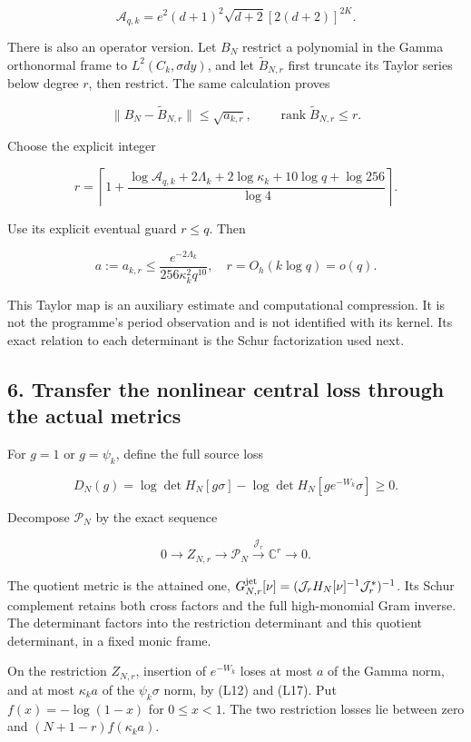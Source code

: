 \[
\mathcal A_{q,k}=e^2(d+1)^2\sqrt{d+2}[2(d+2)]^{2K}.
\]

There is also an operator version. Let \(B_N\) restrict a polynomial in the Gamma orthonormal frame to \(L^2(C_k,\sigma dy)\), and let \(\widetilde B_{N,r}\) first truncate its Taylor series below degree \(r\), then restrict. The same calculation proves

\[
\|B_N-\widetilde B_{N,r}\|\le\sqrt{a_{k,r}},\qquad
\operatorname{rank}\widetilde B_{N,r}\le r.
\tag{L18}
\]

Choose the explicit integer

\[
\boxed{r=\left\lceil 1+
\frac{\log\mathcal A_{q,k}+2\Lambda_k+2\log\kappa_k
+10\log q+\log256}{\log4}\right\rceil.}
\tag{L19}
\]

Use its explicit eventual guard \(r\le q\). Then

\[
a:=a_{k,r}\le\frac{e^{-2\Lambda_k}}{256\kappa_k^2q^{10}},
\quad r=O_h(k\log q)=o(q).
\tag{L20}
\]

This Taylor map is an auxiliary estimate and computational compression. It is not the programme's period observation and is not identified with its kernel. Its exact relation to each determinant is the Schur factorization used next.

\subsection{6. Transfer the nonlinear central loss through the actual metrics}\label{transfer-the-nonlinear-central-loss-through-the-actual-metrics}

For \(g=1\) or \(g=\psi_k\), define the full source loss

\[
D_N(g)=\log\det H_N[g\sigma]-\log\det H_N[ge^{-W_k}\sigma]\ge0.
\tag{L21}
\]

Decompose \(\mathcal P_N\) by the exact sequence

\[
0\longrightarrow Z_{N,r}\longrightarrow\mathcal P_N
\xrightarrow{\mathcal J_r}\mathbb C^r\longrightarrow0.
\]

The quotient metric is the attained one,
\(G_{N,r}^{\rm jet}[\nu]=(\mathcal J_rH_N[\nu]^{-1}\mathcal J_r^*)^{-1}\).
Its Schur complement retains both cross factors and the full high-monomial Gram inverse. The determinant factors into the restriction determinant and this quotient determinant, in a fixed monic frame.

On the restriction \(Z_{N,r}\), insertion of \(e^{-W_k}\) loses at most \(a\) of the Gamma norm, and at most \(\kappa_k a\) of the \(\psi_k\sigma\) norm, by (L12) and (L17). Put \(f(x)=-\log(1-x)\) for \(0\le x<1\). The two restriction losses lie between zero and \((N+1-r)f(\kappa_k a)\).

